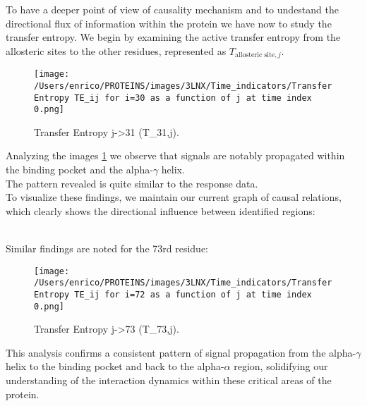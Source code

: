 \documentclass[English, Lau, oneside]{sapthesis}
\begin{document}
\newpage
To have a deeper point of view of causality mechanism and to undestand the directional flux of information within the protein we have now to study the transfer entropy.
We begin by examining the active transfer entropy from the allosteric sites to the other residues, represented as \( T_{\text{allosteric site}, j}\).
\begin{figure}[h!]
    \centering
    \texttt{[image: /Users/enrico/PROTEINS/images/3LNX/Time\_indicators/Transfer Entropy TE\_ij for i=30 as a function of j at time index 0.png]}
    \caption{Transfer Entropy j->31 (T_{31,j}).}
    \label{fig:TE31}
\end{figure}
Analyzing the images \ref{fig:TE31} we observe that signals are notably propagated within the binding pocket and the alpha-$\gamma$ helix.\\
The pattern revealed is quite similar to the response data.\\
To visualize these findings, we maintain our current graph of causal relations, which clearly shows the directional influence between identified regions:
\\

Similar findings are noted for the 73rd residue:
\begin{figure}[h!]
    \centering
    \texttt{[image: /Users/enrico/PROTEINS/images/3LNX/Time\_indicators/Transfer Entropy TE\_ij for i=72 as a function of j at time index 0.png]}
    \caption{Transfer Entropy j->73 (T_{73,j}).}
    \label{fig:TE73}
\end{figure}
This analysis confirms a consistent pattern of signal propagation from the alpha-$\gamma$ helix to the binding pocket and back to the alpha-$\alpha$ region, solidifying our understanding of the interaction dynamics within these critical areas of the protein.
\end{document}
